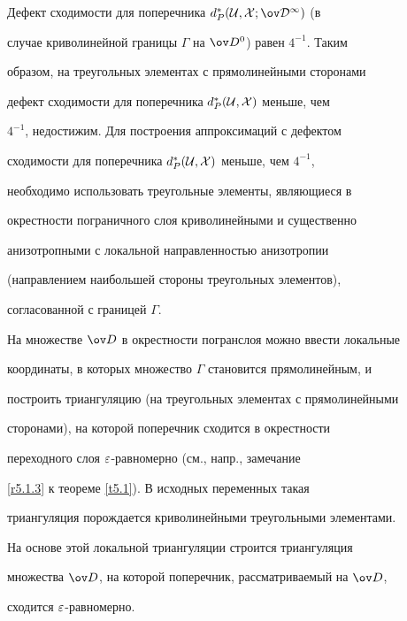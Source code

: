 \begin{notes} \label{r5.2.1}


Дефект сходимости для поперечника $d_{P}^*(\cu,X;\od{}^1)$ (в


случае криволинейной границы $\varGamma$ на $\od{}^0$) равен $4^{-1}$. Таким


образом, на треугольных элементах с прямолинейными сторонами


дефект сходимости для поперечника $d_{P}^*(\cal{U},X)$ меньше, чем


$4^{-1}$, недостижим. Для построения аппроксимаций с дефектом


сходимости для поперечника $d_{P}^*(\cal{U},X)$ меньше, чем $4^{-1}$,


необходимо использовать треугольные элементы, являющиеся в


окрестности пограничного слоя криволинейными и существенно


анизотропными с локальной направленностью анизотропии


(направлением наибольшей стороны треугольных элементов),


согласованной с границей $\varGamma$.


\end{notes}





\begin{notes} \label{r5.2.2}


На множестве $\od$ в окрестности погранслоя можно ввести локальные


координаты, в которых множество $\varGamma$ становится прямолинейным, и


построить триангуляцию (на треугольных элементах с прямолинейными


сторонами), на которой поперечник сходится в окрестности


переходного слоя $\varepsilon$-равномерно (см., напр., замечание


\ref{r5.1.3} к теореме \ref{t5.1}). В исходных переменных такая


триангуляция порождается криволинейными треугольными элементами.


На основе этой локальной триангуляции строится триангуляция


множества $\od$, на которой поперечник, рассматриваемый на $\od$,


сходится $\varepsilon$-равномерно.


\end{notes}





